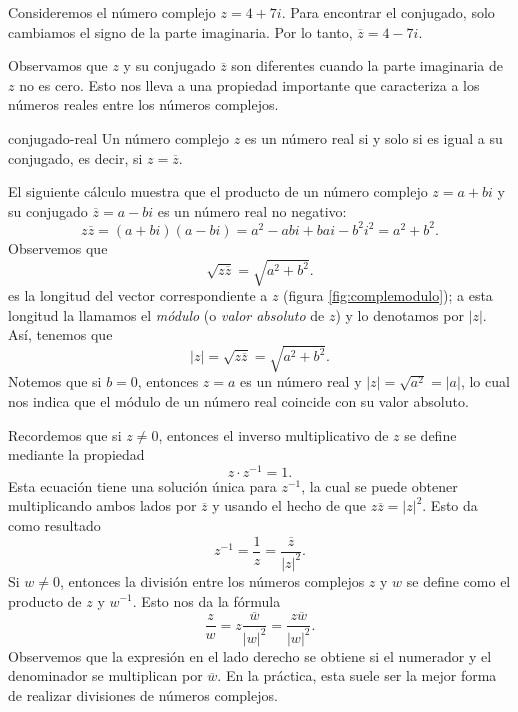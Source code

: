 \newpage

\begin{examplebox}{}{}
    Consideremos el número complejo $z = 4 + 7i$. Para encontrar el conjugado, solo cambiamos el signo de la parte imaginaria. Por lo tanto, $\overline{z} = 4 - 7i$.
\end{examplebox}

Observamos que $z$ y su conjugado $\overline{z}$ son diferentes cuando la parte imaginaria de $z$ no es cero. Esto nos lleva a una propiedad importante que caracteriza a los números reales entre los números complejos.

\begin{theorem}{}{conjugado-real}
    Un número complejo $z$ es un número real si y solo si es igual a su conjugado, es decir, si $z = \overline{z}$.
\end{theorem}

El siguiente cálculo muestra que el producto de un número complejo $z = a + bi$ y su conjugado $\overline{z} = a - bi$ es un número real no negativo:
$$z\overline{z} = (a + bi)(a - bi) = a^2 - abi + bai - b^2 i^2 = a^2 + b^2.$$
Observemos que
$$\sqrt{z\overline{z}} = \sqrt{a^2 + b^2}.$$
es la longitud del vector correspondiente a $z$ (figura \ref{fig:complemodulo}); a esta longitud la llamamos el \emph{módulo} (o \emph{valor absoluto} de $z$) y lo denotamos por $|z|$. Así, tenemos que
$$|z| = \sqrt{z\overline{z}} = \sqrt{a^2 + b^2}.$$
Notemos que si $b = 0$, entonces $z = a$ es un número real y $|z| = \sqrt{a^2} = |a|$, lo cual nos indica que el módulo de un número real coincide con su valor absoluto.

Recordemos que si $z \neq 0$, entonces el inverso multiplicativo de $z$ se define mediante la propiedad
$$z \cdot z^{-1} = 1.$$
Esta ecuación tiene una solución única para $z^{-1}$, la cual se puede obtener multiplicando ambos lados por $\overline{z}$ y usando el hecho de que $z\overline{z} = |z|^2$. Esto da como resultado
$$z^{-1} = \frac{1}{z} = \frac{\overline{z}}{|z|^2}.$$
Si $w \neq 0$, entonces la división entre los números complejos $z$ y $w$ se define como el producto de $z$ y $w^{-1}$. Esto nos da la fórmula
$$\frac{z}{w} = z\frac{\overline{w}}{|w|^2} = \frac{z \overline{w}}{|w|^2}.$$
Observemos que la expresión en el lado derecho se obtiene si el numerador y el denominador se multiplican por $\overline{w}$. En la práctica, esta suele ser la mejor forma de realizar divisiones de números complejos.

